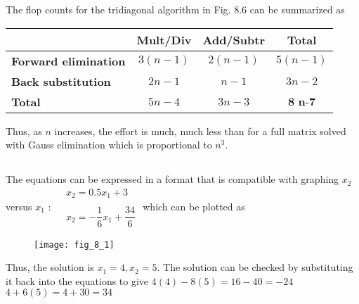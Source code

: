 \documentclass[../main.tex]{subfiles}
\begin{document}
\chapter{}
\label{cha:cha_8}


\section{}
The flop counts for the tridiagonal algorithm in Fig. $8.6$ can be summarized as
\bigbreak
\begin{tabular}{|l|c|c|c|}
\hline
 &\textbf{ Mult/Div} &\textbf{ Add/Subtr} &\textbf{ Total} \\
\hline
\textbf{Forward elimination} & $3(n-1)$ & $2(n-1)$ & $5(n-1)$ \\
\hline
\textbf{Back substitution} & $2 n-1$ & $n-1$ & $3 n-2$ \\
\hline
\textbf{Total} & $5 n-4$ & $3 n-3$ & $\textbf{8 n-7}$ \\
\hline
\end{tabular}
\bigbreak
Thus, as $n$ increases, the effort is much, much less than for a full matrix solved with Gauss elimination which is proportional to $n^{3}$.
\bigbreak


\section{}
The equations can be expressed in a format that is compatible with graphing $x_{2}$ versus $x_{1}$ :
\bigbreak$
\begin{aligned}
&x_{2}=0.5 x_{1}+3 \\\\
&x_{2}=-\dfrac{1}{6} x_{1}+\dfrac{34}{6}
\end{aligned}$
\bigbreak
which can be plotted as
\bigbreak
\begin{figure}[H]
		\hspace*{1.5cm}\texttt{[image: fig\_8\_1]}
		\label{fig:fig_8_1}
	\end{figure}
	

\bigbreak
Thus, the solution is $x_{1}=4, x_{2}=5$. The solution can be checked by substituting it back into the equations to give
\bigbreak
$4(4)-8(5)=16-40=-24$
\bigbreak
$4+6(5)=4+30=34$
\bigbreak
\end{document}
